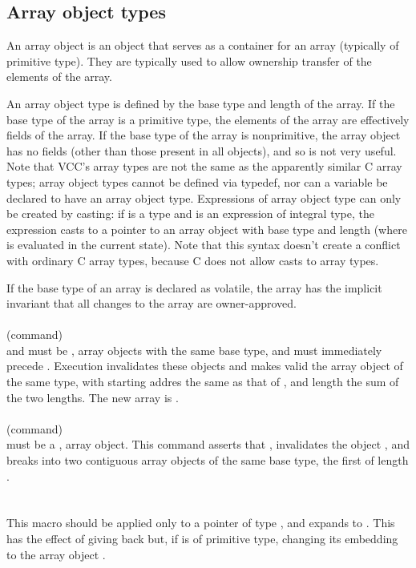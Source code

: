 \documentclass[preprint,nocopyrightspace]{sigplanconf}
\begin{document}
{{{\subsection{Array object types}
An array object is an object that serves as a container for an array
(typically of primitive type). They are typically used to allow
ownership transfer of the elements of the array.

An array  object type is  defined by the  base type and length  of the
array. If the base type of the array is a primitive type, the elements
of the array are effectively fields  of the array. If the base type of
the array is nonprimitive, the  array object has no fields (other than
those present  in all objects), and  so is not very  useful. Note that
VCC's array types  are not the same as the  apparently similar C array
types; array  object types  cannot be defined  via typedef, nor  can a
variable  be declared  to have  an array  object type.  Expressions of
array object type can only be created by casting: if  is a type
and       is    an   expression    of   integral    type,   the
expression    casts   to  a pointer  to an  array
object with  base type   and length   (where   is
evaluated in the current state).  Note that this syntax doesn't create
a conflict with ordinary C array types, because C does not allow casts
to array types.

If the base type of an array is declared as volatile, the array has
the implicit invariant that all changes to the array are
owner-approved.
\\\\
 (command)\\
 and  must be \vcc{\mutable}, \vcc{\writable} array objects with the same
base type, and  must immediately precede . Execution 
invalidates these objects and makes valid the array object of the same
type, with starting addres the same as that of , and length
the sum of the two lengths. The new array is \vcc{\mutable}.
\\\\
 (command)\\
 must be a \vcc{\mutable}, \vcc{\writable} array object. This
command asserts that , invalidates the
object , and breaks  into two \vcc{\mutable} contiguous array
objects of the same base type, the first of length .
\\\\
\\
This macro should be applied only to a pointer  of type , and
expands to . This has the effect of giving
back  but, if  is of primitive type, changing its
embedding to the array object . 

}}}
\end{document}
